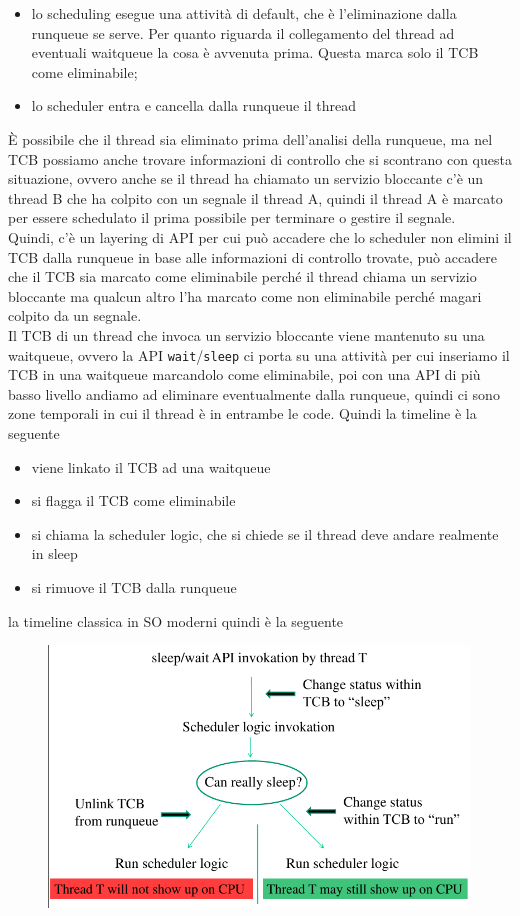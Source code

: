 \documentclass[12pt, oneside]{extbook}
\begin{document}
\begin{itemize}
\item lo scheduling esegue una attività di default, che è l'eliminazione dalla runqueue se serve. Per quanto riguarda il collegamento del thread ad eventuali waitqueue la cosa è avvenuta prima. Questa marca solo il TCB come eliminabile;
\item lo scheduler entra e cancella dalla runqueue il thread
\end{itemize}
È possibile che il thread sia eliminato prima dell'analisi della runqueue, ma nel TCB possiamo anche trovare informazioni di controllo che si scontrano con questa situazione, ovvero anche se il thread ha chiamato un servizio bloccante c'è un thread B che ha colpito con un segnale il thread A, quindi il thread A è marcato per essere schedulato il prima possibile per terminare o gestire il segnale.\\Quindi, c'è un layering di API per cui può accadere che lo scheduler non elimini il TCB dalla runqueue in base alle informazioni di controllo trovate, può accadere che il TCB sia marcato come eliminabile perché il thread chiama un servizio bloccante ma qualcun altro l'ha marcato come non eliminabile perché magari colpito da un segnale.\\Il TCB di un thread che invoca un servizio bloccante viene mantenuto su una waitqueue, ovvero la API \texttt{wait}/\texttt{sleep} ci porta su una attività per cui inseriamo il TCB in una waitqueue marcandolo come eliminabile, poi con una API di più basso livello andiamo ad eliminare eventualmente dalla runqueue, quindi ci sono zone temporali in cui il thread è in entrambe le code. Quindi la timeline è la seguente
\begin{itemize}
\item viene linkato il TCB ad una waitqueue
\item si flagga il TCB come eliminabile
\item si chiama la scheduler logic, che si chiede se il thread deve andare realmente in sleep
\item si rimuove il TCB dalla runqueue
\end{itemize}
la timeline classica in SO moderni quindi è la seguente
\begin{figure}
	\includegraphics[scale=0.3]{immagini/tcb_timeline.png}
\end{figure}
\end{document}
